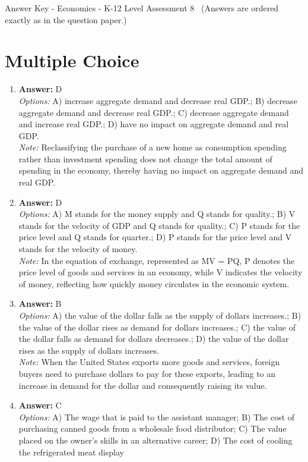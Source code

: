 \documentclass[12pt]{article}
\begin{document}
\begin{center}
Answer Key - Economics - K-12 Level Assessment 8 \
\small (Answers are ordered exactly as in the question paper.)
\end{center}

\section*{Multiple Choice}
\begin{enumerate}[label=\arabic*.]
\item \textbf{Answer:} D
\\ \textit{Options:} A) increase aggregate demand and decrease real GDP.; B) decrease aggregate demand and decrease real GDP.; C) decrease aggregate demand and increase real GDP.; D) have no impact on aggregate demand and real GDP.
\\ \textit{Note:} Reclassifying the purchase of a new home as consumption spending rather than investment spending does not change the total amount of spending in the economy, thereby having no impact on aggregate demand and real GDP.
\item \textbf{Answer:} D
\\ \textit{Options:} A) M stands for the money supply and Q stands for quality.; B) V stands for the velocity of GDP and Q stands for quality.; C) P stands for the price level and Q stands for quarter.; D) P stands for the price level and V stands for the velocity of money.
\\ \textit{Note:} In the equation of exchange, represented as MV = PQ, P denotes the price level of goods and services in an economy, while V indicates the velocity of money, reflecting how quickly money circulates in the economic system.
\item \textbf{Answer:} B
\\ \textit{Options:} A) the value of the dollar falls as the supply of dollars increases.; B) the value of the dollar rises as demand for dollars increases.; C) the value of the dollar falls as demand for dollars decreases.; D) the value of the dollar rises as the supply of dollars increases.
\\ \textit{Note:} When the United States exports more goods and services, foreign buyers need to purchase dollars to pay for these exports, leading to an increase in demand for the dollar and consequently raising its value.
\item \textbf{Answer:} C
\\ \textit{Options:} A) The wage that is paid to the assistant manager; B) The cost of purchasing canned goods from a wholesale food distributor; C) The value placed on the owner's skills in an alternative career; D) The cost of cooling the refrigerated meat display

\end{enumerate}
\end{document}
